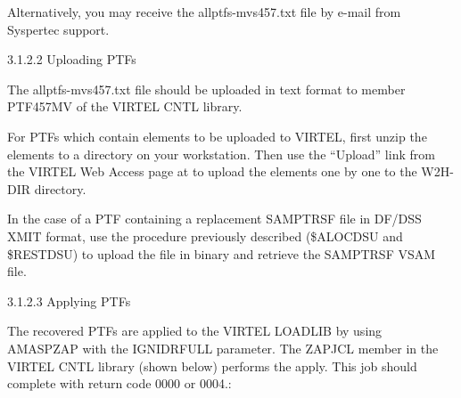 \documentclass[letterpaper,10pt,english]{sphinxmanual}
\begin{document}
Alternatively, you may receive the allptfs-mvs457.txt file by e-mail from Syspertec support.

3.1.2.2 Uploading PTFs

The allptfs-mvs457.txt file should be uploaded in text format to member PTF457MV of the VIRTEL CNTL library.

For PTFs which contain elements to be uploaded to VIRTEL, first unzip the elements to a directory on your workstation. Then use the “Upload” link from the VIRTEL Web Access page at  to upload the elements one by one to the W2H-DIR directory.

In the case of a PTF containing a replacement SAMPTRSF file in DF/DSS XMIT format, use the procedure previously described (\$ALOCDSU and \$RESTDSU) to upload the file in binary and retrieve the SAMPTRSF VSAM file.

3.1.2.3 Applying PTFs

The recovered PTFs are applied to the VIRTEL LOADLIB by using AMASPZAP with the IGNIDRFULL parameter. The ZAPJCL member in the VIRTEL CNTL library (shown below) performs the apply. This job should complete with return code 0000 or 0004.:

\begin{sphinxVerbatim}[commandchars=\\\{\}]
  
   
  
  
  
  
  
  
  
\end{sphinxVerbatim}
\end{document}
